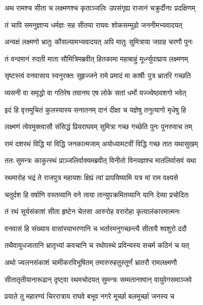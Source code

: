 
\twolineshloka
{अथ रामश्च सीता च लक्ष्मणश्च कृताञ्जलिः}
{उपसंगृह्य राजानं चक्रुर्दीनाः प्रदक्षिणम्} %

\twolineshloka
{तं चापि समनुज्ञाप्य धर्मज्ञः सह सीतया}
{राघवः शोकसम्मूढो जननीमभ्यवादयत्} %

\twolineshloka
{अन्वक्षं लक्ष्मणो भ्रातुः कौसल्यामभ्यवादयत्}
{अपि मातुः सुमित्राया जग्राह चरणौ पुनः} %

\twolineshloka
{तं वन्दमानं रुदती माता सौमित्रिमब्रवीत्}
{हितकामा महाबाहुं मूर्ध्न्युपाघ्राय लक्ष्मणम्} %

\twolineshloka
{सृष्टस्त्वं वनवासाय स्वनुरक्तः सुहृज्जने}
{रामे प्रमादं मा कार्षीः पुत्र भ्रातरि गच्छति} %

\twolineshloka
{व्यसनी वा समृद्धो वा गतिरेष तवानघ}
{एष लोके सतां धर्मो यज्ज्येष्ठवशगो भवेत्} %

\twolineshloka
{इदं हि वृत्तमुचितं कुलस्यास्य सनातनम्}
{दानं दीक्षा च यज्ञेषु तनुत्यागो मृधेषु हि} %

\twolineshloka
{लक्ष्मणं त्वेवमुक्त्वासौ संसिद्धं प्रियराघवम्}
{सुमित्रा गच्छ गच्छेति पुनः पुनरुवाच तम्} %

\twolineshloka
{रामं दशरथं विद्धि मां विद्धि जनकात्मजाम्}
{अयोध्यामटवीं विद्धि गच्छ तात यथासुखम्} %

\twolineshloka
{ततः सुमन्त्रः काकुत्स्थं प्राञ्जलिर्वाक्यमब्रवीत्}
{विनीतो विनयज्ञश्च मातलिर्वासवं यथा} %

\twolineshloka
{रथमारोह भद्रं ते राजपुत्र महायशः}
{क्षिप्रं त्वां प्रापयिष्यामि यत्र मां राम वक्ष्यसे} %

\twolineshloka
{चतुर्दश हि वर्षाणि वस्तव्यानि वने त्वया}
{तान्युपक्रमितव्यानि यानि देव्या प्रचोदितः} %

\twolineshloka
{तं रथं सूर्यसंकाशं सीता हृष्टेन चेतसा}
{आरुरोह वरारोहा कृत्वालंकारमात्मनः} %

\twolineshloka
{वनवासं हि संख्याय वासांस्याभरणानि च}
{भर्तारमनुगच्छन्त्यै सीतायै श्वशुरो ददौ} %

\twolineshloka
{तथैवायुधजातानि भ्रातृभ्यां कवचानि च}
{रथोपस्थे प्रविन्यस्य सचर्म कठिनं च यत्} %

\twolineshloka
{अथो ज्वलनसंकाशं चामीकरविभूषितम्}
{तमारुरुहतुस्तूर्णं भ्रातरौ रामलक्ष्मणौ} %

\twolineshloka
{सीतातृतीयानारूढान् दृष्ट्वा रथमचोदयत्}
{सुमन्त्रः सम्मतानश्वान् वायुवेगसमाञ्जवे} %

\twolineshloka
{प्रयाते तु महारण्यं चिररात्राय राघवे}
{बभूव नगरे मूर्च्छा बलमूर्च्छा जनस्य च} %

